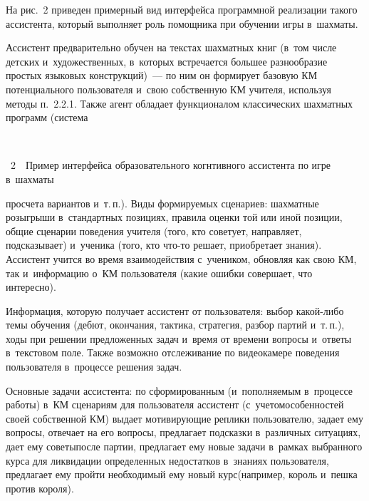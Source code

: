\begin{multicols}{2}
  На рис.~2 приведен примерный вид интерфейса программной реализации 
такого ассистента, который выполняет роль помощника при обучении игры 
в~шахматы.
  

  
  Ассистент предварительно обучен на текстах шахматных книг (в~том числе 
детских и~художественных, в~которых встречается большее разнообразие 
простых языковых конструкций)~--- по ним он формирует базовую 
КМ потенциального пользователя и~свою собственную КМ учителя, 
используя методы п.~2.2.1. Также агент обладает функционалом классических 
шахматных программ (система\linebreak\vspace*{-12pt}

{ \begin{center}  %
 \vspace*{-3pt}
\mbox{%
 \epsfxsize=79mm 
 }


\end{center}



\noindent
{{\figurename~2}\ \ \small{Пример интерфейса образовательного когнтивного ассистента по игре 
в~шахматы}}

}


\vspace*{12pt}


  
  \noindent
   просчета вариантов и~т.\,п.). Виды 
формируемых сценариев: шахматные розыгрыши в~стандартных позициях, 
правила оценки той или иной позиции, общие сценарии поведения учителя 
(того, кто советует, направляет, подсказывает) и~ученика (того, кто что-то 
решает, приобретает знания). Ассистент учится во время взаимодействия 
с~учеником, обновляя как свою КМ, так и~информацию о~КМ 
пользователя (какие ошибки совершает, что интересно).
  
  Информация, которую получает ассистент от пользователя: выбор  
ка\-кой-ли\-бо темы обучения (дебют, окончания, тактика, стратегия, разбор 
партий и~т.\,п.), ходы при решении предложенных задач и~время от времени 
вопросы и~ответы в~текстовом поле. Также возможно отслеживание по 
видеокамере поведения пользователя в~процессе решения задач.
  
  Основные задачи ассистента: по сформированным (и~пополняемым 
в~процессе работы) в~КМ сценариям для пользователя ассистент 
(с~учетом\linebreak особенностей своей собственной КМ) выдает 
мотивирующие реплики пользователю, задает ему вопросы, отвечает на его 
вопросы, предлагает подсказки в~различных ситуациях, дает ему советы\linebreak после 
партии, предлагает ему новые задачи в~рамках выбранного курса для 
ликвидации определенных недостатков в~знаниях пользователя, предлагает ему 
пройти необходимый ему новый курс\linebreak (например, король и~пешка против 
короля). 


\end{multicols}
